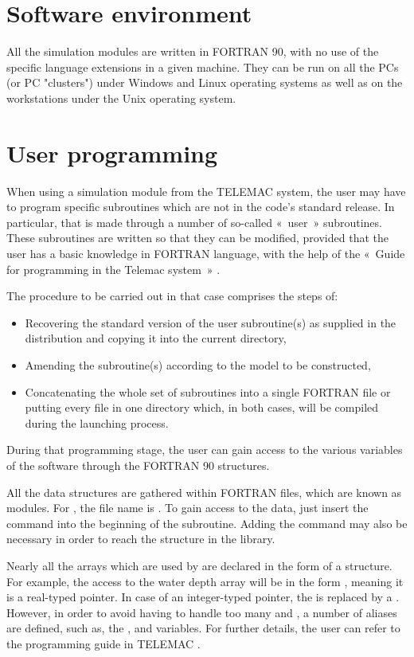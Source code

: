 \section{Software environment}

All the simulation modules are written in FORTRAN 90, with no use of the
specific language extensions in a given machine. They can be run on all the PCs
(or PC "clusters") under Windows and Linux operating systems as well as on the
workstations under the Unix operating system.

\section{User programming}

When using a simulation module from the TELEMAC system, the user may have to
program specific subroutines which are not in the code's standard release. In
particular, that is made through a number of so-called «~user~» subroutines.
These subroutines are written so that they can be modified, provided that the
user has a basic knowledge in FORTRAN language, with the help of the «~Guide
for programming in the Telemac system~» \cite{HervouetProg2009}.

The procedure to be carried out in that case comprises the steps of:

\begin{itemize}
\item Recovering the standard version of the user subroutine(s) as supplied in
the distribution and copying it into the current directory,
\item Amending the subroutine(s) according to the model to be constructed,
\item Concatenating the whole set of subroutines into a single FORTRAN file
or putting every file in one directory
which, in both cases,
will be compiled during the  launching process.
\end{itemize}

During that programming stage, the user can gain access to the various
variables of the software through the FORTRAN 90 structures.

All the data structures are gathered within FORTRAN files, which are known as
modules. For , the file name is . To gain
access to the  data, just insert the command  into the beginning of the subroutine. Adding the
command  may also be necessary in order to reach the structure in the
\bief library.

Nearly all the arrays which are used by  are declared in the form of
a structure. For example, the access to the water depth array will be in the
form ,  meaning it is a real-typed pointer.
In case of an integer-typed pointer, the  is replaced by a .
However, in order to avoid having to handle too many  and ,
a number of aliases are defined, such as, the ,  and
 variables. For further details, the user can refer to
the programming guide in TELEMAC \cite{HervouetProg2009}.
